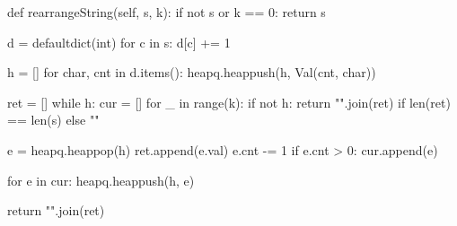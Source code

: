 \begin{python}
def rearrangeString(self, s, k):
  if not s or k == 0: return s

  d = defaultdict(int)
  for c in s:
    d[c] += 1

  h = []
  for char, cnt in d.items():
    heapq.heappush(h, Val(cnt, char))

  ret = []
  while h:
    cur = []
    for _ in range(k):
      if not h: 
        return "".join(ret) if len(ret) == len(s) else ""

      e = heapq.heappop(h)
      ret.append(e.val)
      e.cnt -= 1
      if e.cnt > 0:
        cur.append(e)

    for e in cur:
      heapq.heappush(h, e)

  return "".join(ret)

\end{python}

